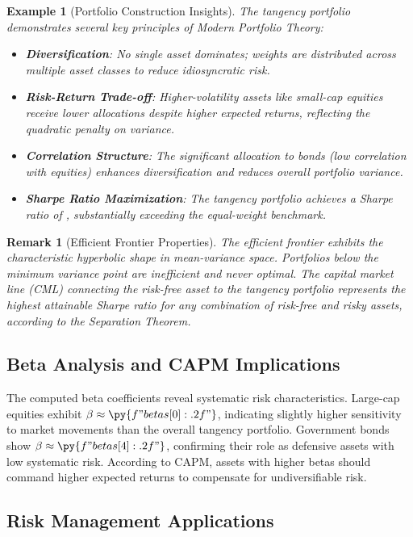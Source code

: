 \documentclass[a4paper, 11pt]{article}
\newtheorem{example}{Example}[section]
\newtheorem{remark}{Remark}[section]
\begin{document}
\begin{example}[Portfolio Construction Insights]
The tangency portfolio demonstrates several key principles of Modern Portfolio Theory:
\begin{itemize}
\item \textbf{Diversification}: No single asset dominates; weights are distributed across
multiple asset classes to reduce idiosyncratic risk.
\item \textbf{Risk-Return Trade-off}: Higher-volatility assets like small-cap equities
receive lower allocations despite higher expected returns, reflecting the quadratic penalty
on variance.
\item \textbf{Correlation Structure}: The significant allocation to bonds (low correlation
with equities) enhances diversification and reduces overall portfolio variance.
\item \textbf{Sharpe Ratio Maximization}: The tangency portfolio achieves a Sharpe ratio of
, substantially exceeding the equal-weight benchmark.
\end{itemize}
\end{example}

\begin{remark}[Efficient Frontier Properties]
The efficient frontier exhibits the characteristic hyperbolic shape in mean-variance space.
Portfolios below the minimum variance point are inefficient and never optimal. The capital
market line (CML) connecting the risk-free asset to the tangency portfolio represents the
highest attainable Sharpe ratio for any combination of risk-free and risky assets, according
to the Separation Theorem.
\end{remark}

\subsection{Beta Analysis and CAPM Implications}

The computed beta coefficients reveal systematic risk characteristics. Large-cap equities
exhibit $\beta \approx \py{f"{betas[0]:.2f}"}$, indicating slightly higher sensitivity to
market movements than the overall tangency portfolio. Government bonds show $\beta \approx
\py{f"{betas[4]:.2f}"}$, confirming their role as defensive assets with low systematic risk.
According to CAPM, assets with higher betas should command higher expected returns to
compensate for undiversifiable risk.

\subsection{Risk Management Applications}
\end{document}

